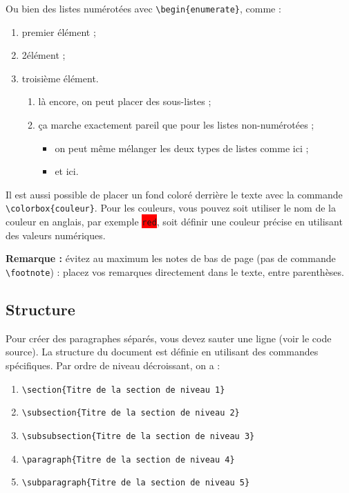 \documentclass{ceri}
\begin{document}
Ou bien des listes numérotées avec \texttt{\textbackslash{}begin\{enumerate\}}, comme :
\begin{enumerate}
	\item premier élément ;
	\item 2\ieme élément ;
	\item troisième élément.
	\begin{enumerate}
		\item là encore, on peut placer des sous-listes ;
		\item ça marche exactement pareil que pour les listes non-numérotées ;
		\begin{itemize}
			\item on peut même mélanger les deux types de listes comme ici ;
			\item et ici.
		\end{itemize}
	\end{enumerate}
\end{enumerate}
Il est aussi possible de placer un fond coloré derrière le texte avec la commande \texttt{\textbackslash{}colorbox\{couleur\}}. Pour les couleurs, vous pouvez soit utiliser le nom de la couleur en anglais, par exemple \colorbox{red}{\texttt{red}}, soit définir une couleur précise en utilisant des valeurs numériques.

\textbf{Remarque :} évitez au maximum les notes de bas de page (pas de commande \texttt{\textbackslash{}footnote}) : placez vos remarques directement dans le texte, entre parenthèses.

\subsection{Structure}
\label{sec:structure}
Pour créer des paragraphes séparés, vous devez sauter une ligne (voir le code source). La structure du document est définie en utilisant des commandes spécifiques. Par ordre de niveau décroissant, on a :
\begin{enumerate}
	\item \texttt{\textbackslash{}section\{Titre de la section de niveau 1\}}
	\item \texttt{\textbackslash{}subsection\{Titre de la section de niveau 2\}}
	\item \texttt{\textbackslash{}subsubsection\{Titre de la section de niveau 3\}}
	\item \texttt{\textbackslash{}paragraph\{Titre de la section de niveau 4\}}
	\item \texttt{\textbackslash{}subparagraph\{Titre de la section de niveau 5\}}
\end{enumerate}
\end{document}
